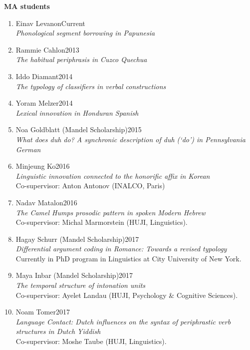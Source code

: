 \documentclass[letterpaper,11pt]{article}
\begin{document}
\begin{flushleft}\textbf{MA students}
\end{flushleft}
\begin{enumerate}
\item {Einav Levanon}\hfill{Current}\\
\textit{Phonological segment borrowing in Papunesia}\\

\item Rammie Cahlon\hfill{2013}\\
\textit{The habitual periphrasis in Cuzco Quechua}\\

\item Iddo Diamant\hfill{2014}\\
\textit{The typology of classifiers in verbal constructions}\\ 

\item{Yoram Melzer}\hfill{2014}\\\textit{Lexical innovation in Honduran Spanish}\\ 

\item {Noa Goldblatt (Mandel Scholarship)}\hfill{2015}\\
\textit{What does \emph{duh} do? A synchronic description of \emph{duh} (‘do’) in Pennsylvania German}

\item {Minjeung Ko}\hfill{2016}\\\textit{Linguistic innovation connected to the honorific affix in Korean}\\Co-supervisor: Anton Antonov (INALCO, Paris)\\	

\item {Nadav Matalon}\hfill{2016}\\\textit{The Camel Humps prosodic pattern in spoken Modern Hebrew}\\Co-supervisor: Michal Marmorstein (HUJI, Linguistics).

\item {Hagay Schurr (Mandel Scholarship)}\hfill{2017}\\\textit{Differential argument coding in Romance: Towards a revised typology}\\
Currently in PhD program in Linguistics at City University of New York.	
\item {Maya Inbar (Mandel Scholarship)}\hfill{2017}\\\textit{The temporal structure of intonation units}\\Co-supervisor: Ayelet Landau (HUJI, Psychology \& Cognitive Sciences).	

\item {Noam Tomer}\hfill{2017}\\{\textit{Language Contact:  Dutch influences on the syntax of periphrastic verb structures in Dutch Yiddish}}\\ Co-supervisor: Moshe Taube (HUJI, Linguistics). 
\end{enumerate}
\end{document}

